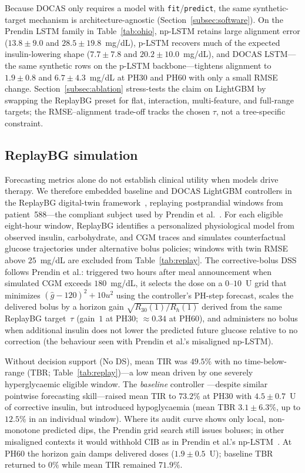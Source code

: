 \documentclass[a4paper,fleqn]{cas-sc}
\begin{document}
\FloatBarrier


Because DOCAS only requires a model with \texttt{fit}/\texttt{predict}, the
same synthetic-target mechanism is architecture-agnostic
(Section~\ref{subsec:software}). On the Prendin LSTM family in
Table~\ref{tab:ohio}, np-LSTM retains large alignment error
($13.8\pm9.0$ and $28.5\pm19.8$~mg/dL), p-LSTM recovers much of the expected
insulin-lowering shape ($7.7\pm7.8$ and $20.2\pm10.0$~mg/dL), and DOCAS
LSTM---the same synthetic rows on the p-LSTM backbone---tightens alignment to
$1.9\pm0.8$ and $6.7\pm4.3$~mg/dL at PH30 and PH60 with only a small RMSE
change. Section~\ref{subsec:ablation} stress-tests the claim on LightGBM by
swapping the ReplayBG preset for flat, interaction, multi-feature, and
full-range targets; the RMSE--alignment trade-off tracks the chosen $\tau$,
not a tree-specific constraint.

\subsection{ReplayBG simulation}\label{subsec:replay-results}

Forecasting metrics alone do not establish clinical utility when models drive
therapy. We therefore embedded baseline and DOCAS LightGBM controllers in the
ReplayBG digital-twin framework~\citep{cappon2023}, replaying postprandial
windows from patient~588---the compliant subject used by Prendin et
al.~\citep{prendin2023}. For each eligible eight-hour window, ReplayBG
identifies a personalized physiological model from observed insulin,
carbohydrate, and CGM traces and simulates counterfactual glucose trajectories
under alternative bolus policies; windows with twin RMSE above
$25$~mg/dL are excluded from Table~\ref{tab:replay}. The corrective-bolus DSS
follows Prendin et al.: triggered two hours after meal announcement when
simulated CGM exceeds $180$~mg/dL, it selects the dose on a $0$--$10$~U grid that
minimizes $(\hat g-120)^2+10u^2$ using the controller's PH-step forecast,
scales the delivered bolus by a horizon gain
$\sqrt{R_{30}(1)/R_h(1)}$ derived from the same ReplayBG target~$\tau$
(gain~$1$ at PH30; $\approx0.34$ at PH60), and administers no bolus when
additional insulin does not lower the predicted future glucose relative to no
correction (the behaviour seen with Prendin et al.'s misaligned np-LSTM).

Without decision support (No DS), mean TIR was $49.5\%$ with no
time-below-range (TBR; Table~\ref{tab:replay})---a low mean driven by one
severely hyperglycaemic eligible window. The \emph{baseline} controller
---despite similar pointwise forecasting skill---raised mean TIR to
$73.2\%$ at PH30 with $4.5\pm0.7$~U of corrective insulin, but introduced
hypoglycaemia (mean TBR $3.1\pm6.3\%$, up to $12.5\%$ in an individual window).
Where its audit curve shows only local, non-monotone predicted dips, the
Prendin grid search still issues boluses; in other misaligned contexts it
would withhold CIB as in Prendin et al.'s np-LSTM~\citep{prendin2023}. At PH60
the horizon gain damps delivered doses ($1.9\pm0.5$~U); baseline TBR returned
to $0\%$ while mean TIR remained $71.9\%$.
\end{document}
